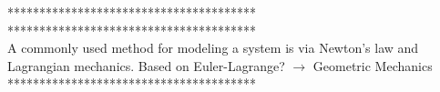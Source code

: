 \documentclass[a4paper,11pt]{mscThesis}
\begin{document}
	    ***************************************\\
	    
	    
	    
	    ***************************************\\
	    A commonly used method for modeling a system is via Newton's law and Lagrangian mechanics. 
	    Based on Euler-Lagrange? $ \rightarrow $ Geometric Mechanics\\
	   
	    ***************************************\\
		

	    
	    
	    
	    
\end{document}
